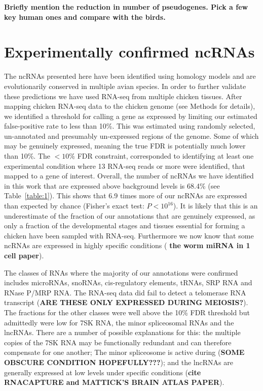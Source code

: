 \documentclass[10pt]{bmc_article}
\newenvironment{bmcformat}{\begin{raggedright}\baselineskip20pt\sloppy\setboolean{publ}{false}}{\end{raggedright}\baselineskip20pt\sloppy}
\begin{document}
\begin{bmcformat}
{\bf Briefly mention the reduction in number of pseudogenes. Pick a
  few key human ones and compare with the birds. }

\section*{Experimentally confirmed ncRNAs}

The ncRNAs presented here have been identified using homology models
and are evolutionarily conserved in multiple avian species. In order
to further validate these predictions we have used RNA-seq from
multiple chicken tissues. After mapping chicken RNA-seq data to the
chicken genome (see Methods for details), we identified a threshold
for calling a gene as expressed by limiting our estimated
false-positive rate to less than 10\%. This was estimated using
randomly selected, un-annotated and presumably un-expressed regions of
the genome. Some of which may be genuinely expressed, meaning the true
FDR is potentially much lower than 10\%. The $<10\%$ FDR constraint,
corresponded to identifying at least one experimental condition where
13 RNA-seq reads or more were identified, that mapped to a gene of
interest. Overall, the number of ncRNAs we have identified in this
work that are expressed above background levels is 68.4\% (see
Table~\ref{table:1}). This shows that 6.9 times more of our ncRNAs are
expressed than expected by chance (Fisher's exact test:
$P<10^{16}$). It is likely that this is an underestimate of the
fraction of our annotations that are genuinely expressed, as only a
fraction of the developmental stages and tissues essential for forming
a chicken have been sampled with RNA-seq. Furthermore we now know that
some ncRNAs are expressed in highly specific conditions \cite{} ({\bf
  the worm miRNA in 1 cell paper}).

The classes of RNAs where the majority of our annotations were
confirmed includes microRNAs, snoRNAs, cis-regulatory elements, tRNAs,
SRP RNA and RNase P/MRP RNA. The RNA-seq data did fail to detect a
telomerase RNA transcript ({\bf ARE THESE ONLY EXPRESSED DURING
  MEIOSIS?}). The fractions for the other classes were well above the
10\% FDR threshold but admittedly were low for 7SK RNA, the minor
spliceosomal RNAs and the lncRNAs. There are a number of possible
explanations for this: the multiple copies of the 7SK RNA may be
functionally redundant and can therefore compensate for one another;
The minor spliceosome is active during ({\bf SOME OBSCURE CONDITION
  HOPEFULLY???}); and the lncRNAs are generally expressed at low
levels under specific conditions ({\bf cite RNACAPTURE and MATTICK'S
  BRAIN ATLAS PAPER}).


\end{bmcformat}
\end{document}
